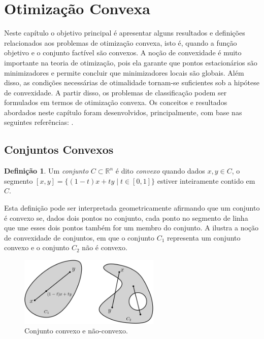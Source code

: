 \documentclass[12pt,a4paper]{scrartcl}
\def\RR{\mathds{R}}
\theoremstyle{definition}%
\newtheorem{defi}{Definição}
\begin{document}





\newpage

\section{Otimização Convexa} \label{chap:otimizacao_convexa}


Neste capítulo o objetivo principal é apresentar alguns resultados e definições relacionados aos problemas de otimização convexa, isto é, quando a função objetivo e o conjunto factível são convexos. A noção de convexidade é muito importante na teoria de otimização, pois ela garante que pontos estacionários são minimizadores e permite concluir que minimizadores locais são globais. Além disso, as condições necessárias de otimalidade tornam-se suficientes sob a hipótese de convexidade. A partir disso, os problemas de classificação podem ser formulados em termos de otimização convexa. Os conceitos e resultados abordados neste capítulo foram desenvolvidos, principalmente, com base nas seguintes referências: \textcite{Evelin2017,Ademir2013,Izmailov2014ac}.

\subsection{Conjuntos Convexos}

\begin{defi} 
Um \emph{conjunto} $C \subset \RR^{n}$ é dito \emph{convexo} quando dados $x,y \in C$, o segmento $[x,y] = \{ (1-t)x + ty \mid t\in [0,1] \}$ estiver inteiramente contido em $C$.
\end{defi}

Esta definição pode ser interpretada geometricamente afirmando que um conjunto é convexo se, dados dois pontos no conjunto, cada ponto no segmento de linha que une esses dois pontos também for um membro do conjunto. A  ilustra a noção de convexidade de conjuntos, em que o conjunto $C_{1}$ representa um conjunto convexo e o conjunto $C_{2}$ não é convexo.


\begin{figure}[!ht] 
	\centering
	\includegraphics[width=0.60\textwidth]{conjuntos_convexo_naoconvexo}
	\caption{ Conjunto convexo e não-convexo. \label{fig:conjuntos_convexos}}
\end{figure}
\end{document}

